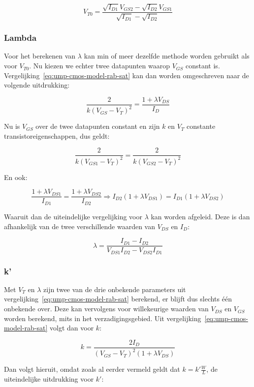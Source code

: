 \documentclass{article}
\begin{document}
\begin{equation} \label{eq:ump-vt0}
	V_{T0} = \frac{\sqrt{I_{D1}}V_{GS2} - \sqrt{I_{D2}}V_{GS1}}{\sqrt{I_{D1}} - \sqrt{I_{D2}}}
\end{equation}

\subsubsection{Lambda}
\label{subsubsec:ump-methode-verw-lambda}
Voor het berekenen van $\lambda$ kan min of meer dezelfde methode worden gebruikt als voor $V_{T0}$. Nu kiezen we echter twee datapunten waarop $V_{GS}$ constant is. Vergelijking~\ref{eq:ump-cmos-model-rab-sat} kan dan worden omgeschreven naar de volgende uitdrukking:

$$\frac{2}{k(V_{GS}-V_{T})^2} = \frac{1 + \lambda V_{DS}}{I_{D}}$$

Nu is $V_{GS}$ over de twee datapunten constant en zijn $k$ en $V_{T}$ constante transistoreigenschappen, dus geldt:

$$\frac{2}{k(V_{GS1}-V_{T})^2} = \frac{2}{k(V_{GS2}-V_{T})^2}$$

En ook:

$$\frac{1 + \lambda V_{DS1}}{I_{D1}} = \frac{1 + \lambda V_{DS2}}{I_{D2}} \Rightarrow I_{D2}(1 + \lambda V_{DS1}) = I_{D1}(1 + \lambda V_{DS2})$$

Waaruit dan de uiteindelijke vergelijking voor $\lambda$ kan worden afgeleid. Deze is dan afhankelijk van de twee verschillende waarden van $V_{DS}$ en $I_{D}$:

\begin{equation} \label{eq:ump-lambda}
	\lambda = \frac{I_{D1} - I_{D2}}{V_{DS1}I_{D2} - V_{DS2}I_{D1}}
\end{equation}

\subsubsection{k'}
\label{subsubsec:ump-methode-verw-lambda}
Met $V_{T}$ en $\lambda$ zijn twee van de drie onbekende parameters uit vergelijking~\ref{eq:ump-cmos-model-rab-sat} berekend, er blijft dus slechts één onbekende over. Deze kan vervolgens voor willekeurige waarden van $V_{DS}$ en $V_{GS}$ worden berekend, mits in het verzadigingsgebied. Uit vergelijking~\ref{eq:ump-cmos-model-rab-sat} volgt dan voor $k$:

$$k = \frac{2I_{D}}{(V_{GS} - V_{T})^2(1 + \lambda V_{DS})}$$

Dan volgt hieruit, omdat zoals al eerder vermeld geldt dat $k = k'\frac{W}{L}$, de uiteindelijke uitdrukking voor $k'$:
\end{document}
